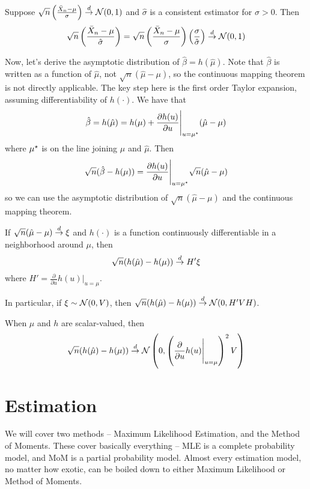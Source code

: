 \documentclass[10pt]{article}
\begin{document}
\begin{example}
	Suppose $\sqrt{n}\left( \frac{\bar{X}_n - \mu}{\sigma}\right) \overset{d}{\to} \mathcal{N}(0,1)$ and $\hat{\sigma}$ is a consistent estimator for $\sigma > 0$. Then
	\[
	\sqrt{n}\left( \frac{\bar{X}_n - \mu}{\hat{\sigma}}\right) = \sqrt{n}\left( \frac{\bar{X}_n - \mu}{\sigma}\right) \left( \frac{\sigma}{\hat{\sigma}}\right) \overset{d}{\to} \mathcal{N}(0,1)
	\]
\end{example}

Now, let's derive the asymptotic distribution of $\hat{\beta} = h(\hat{\mu})$. Note that $\hat{\beta}$ is written as a function of $\hat{\mu}$, not $\sqrt{n}(\hat{\mu} - \mu)$, so the continuous mapping theorem is not directly applicable. The key step here is the first order Taylor expansion, assuming differentiability of $h(\cdot)$. We have that
\[
\hat{\beta} = h(\hat{\mu}) = h(\mu) + \frac{\partial h(u)}{\partial u} \Biggr|_{u = \mu^\star} (\hat{\mu} - \mu)
\]
where $\mu^\star$ is on the line joining $\mu$ and $\hat{\mu}$. Then
\[
\sqrt{n} (\hat{\beta} - h(\mu)) = \frac{\partial h(u)}{\partial u} \Biggr|_{u = \mu^\star} \sqrt{n}(\hat{\mu} - \mu)
\]
so we can use the asymptotic distribution of $\sqrt{n}(\hat{\mu} - \mu)$ and the continuous mapping theorem.

\begin{theorem}
	 If $\sqrt{n}(\hat{\mu} - \mu) \overset{d}{\to} \xi$ and $h(\cdot)$ is a function continuously differentiable in a neighborhood around $\mu$, then
	\[
	\sqrt{n}(h(\hat{\mu}) - h(\mu)) \overset{d}{\to} H' \xi
	\]
	where $H' = \frac{\partial}{\partial u} h(u) \Big|_{u = \mu}$.
	
	In particular, if $\xi \sim \mathcal{N}(0,V)$, then $\sqrt{n}(h(\hat{\mu}) - h(\mu)) \overset{d}{\to} \mathcal{N}(0,H'VH)$.
	
	When $\mu$ and $h$ are scalar-valued, then
	\[
	\sqrt{n}(h(\hat{\mu}) - h(\mu)) \overset{d}{\to} \mathcal{N}\left(0,\left( \frac{\partial}{\partial u}h(u) \Bigg|_{u = \mu} \right)^2 V\right)
	\]
\end{theorem}

\newpage

\section{Estimation}

We will cover two methods -- Maximum Likelihood Estimation, and the Method of Moments. These cover basically everything -- MLE is a complete probability model, and MoM is a partial probability model. Almost every estimation model, no matter how exotic, can be boiled down to either Maximum Likelihood or Method of Moments.
\end{document}
